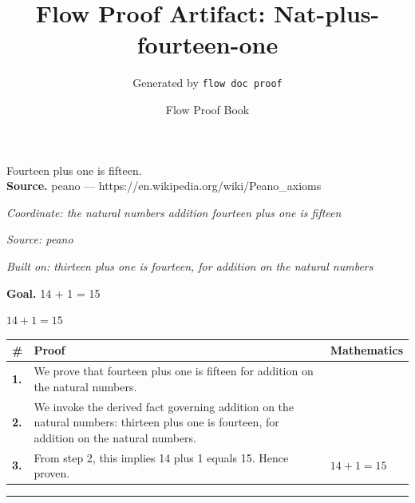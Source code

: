 \documentclass[11pt]{article}
\title{Flow Proof Artifact: Nat-plus-fourteen-one}
\author{Generated by \texttt{flow doc proof}}
\date{Flow Proof Book}
\theoremstyle{definition}
\begin{document}
\maketitle
Fourteen plus one is fifteen.\\[0.5em]
\textbf{Source.} peano — https://en.wikipedia.org/wiki/Peano\_axioms\\[0.5em]
\bigskip
{}\par
\smallskip\noindent\textit{Coordinate: the natural numbers \cdot addition \cdot fourteen plus one is fifteen}\par
\smallskip\noindent\textit{Source: peano}\par
\smallskip\noindent\textit{Built on: thirteen plus one is fourteen, for addition on the natural numbers}\par
\medskip
\noindent\textbf{Goal.} 14 + 1 = 15\par
\noindent$\displaystyle 14 + 1 = 15$\par
\medskip
\noindent
\begin{tabular}{@{} >{\raggedright\arraybackslash}p{} >{\raggedright\arraybackslash}p{} >{\raggedleft\arraybackslash}p{} @{}}
\textbf{\#} & \textbf{Proof} & \textbf{Mathematics} \\
\midrule
\textbf{1.} & We prove that fourteen plus one is fifteen for addition on the natural numbers. & \\[0.45em]
\textbf{2.} & We invoke the derived fact governing addition on the natural numbers: thirteen plus one is fourteen, for addition on the natural numbers. & \\[0.45em]
\textbf{3.} & From step 2, this implies 14 plus 1 equals 15. Hence proven. & $\displaystyle 14 + 1 = 15$ \\[0.45em]
\bottomrule
\end{tabular}
\label{thm:Nat-addition-fourteen_plus_one_is_fifteen}
\par\medskip\hrule
\end{document}
